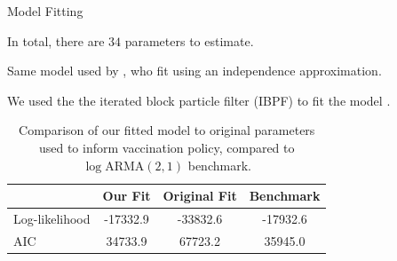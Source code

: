 \documentclass[aspectratio=169]{beamer}\usepackage[]{graphicx}\usepackage[]{xcolor}
\begin{document}

\begin{frame}{Model Fitting}

In total, there are $34$ parameters to estimate.

Same model used by \citet[Group~3 of][]{lee20}, who fit using an independence approximation.

We used the the iterated block particle filter (IBPF) to fit the model \citep{ionides24}.

\begin{table}[ht]
\centering
\begin{tabular}{|l|c|c|c|}
\hline
 & \textbf{Our Fit} & \textbf{Original Fit} & \textbf{Benchmark} \\
\hline
Log-likelihood & \cellcolor{green!20}-17332.9 & \cellcolor{red!20}-33832.6 & -17932.6 \\
\hline
AIC & \cellcolor{green!20}34733.9 & \cellcolor{red!20}67723.2 & 35945.0 \\
\hline
\end{tabular}
\caption{Comparison of our fitted model to original parameters used to inform vaccination policy, compared to $\log\mathrm{ARMA}(2, 1)$ benchmark.}
\label{tab:fit_comparison}
\end{table}

\end{frame}
\end{document}

